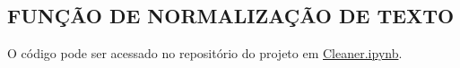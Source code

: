 \begin{apendicesenv}

\partapendices

\chapter{FUNÇÃO DE NORMALIZAÇÃO DE TEXTO}
\label{chap:funcao_normalizacao_texto}

O código pode ser acessado no repositório do projeto em \href{https://github.com/allanbatista/classificacao-de-produtos-no-e-commerce/blob/master/codigo/notebooks/Cleaner.ipynb}{Cleaner.ipynb}.

\end{apendicesenv}